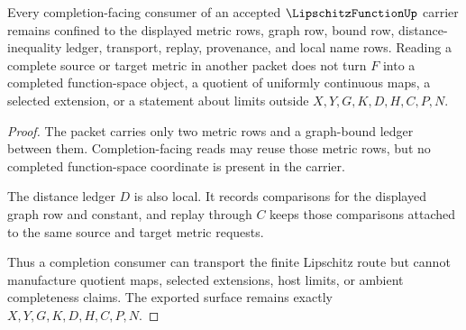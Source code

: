 \begin{theorem}
\label{thm:lipschitz-function-completion-nonescape}
Every completion-facing consumer of an accepted $\LipschitzFunctionUp$ carrier remains confined to the displayed metric rows, graph row, bound row, distance-inequality ledger, transport, replay, provenance, and local name rows. Reading a complete source or target metric in another packet does not turn $F$ into a completed function-space object, a quotient of uniformly continuous maps, a selected extension, or a statement about limits outside $X,Y,G,K,D,H,C,P,N$.
\end{theorem}
\begin{proof}
The packet carries only two metric rows and a graph-bound ledger between them. Completion-facing reads may reuse those metric rows, but no completed function-space coordinate is present in the carrier.

The distance ledger $D$ is also local. It records comparisons for the displayed graph row and constant, and replay through $C$ keeps those comparisons attached to the same source and target metric requests.

Thus a completion consumer can transport the finite Lipschitz route but cannot manufacture quotient maps, selected extensions, host limits, or ambient completeness claims. The exported surface remains exactly $X,Y,G,K,D,H,C,P,N$.
\end{proof}


\begin{closurestatus}{\LipschitzFunctionUp}
  \theoryclosure{\seedClosure}
  \formalstatus{\unformalizedV}
\end{closurestatus}
